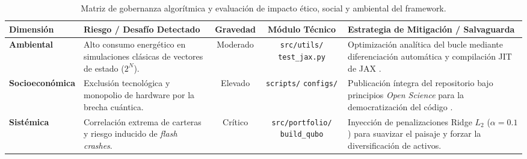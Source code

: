 \begin{table}[htbp]
    \centering
    \caption{Matriz de gobernanza algorítmica y evaluación de impacto ético, social y ambiental del framework.}
    \label{tab:evaluacion_impacto_etica}
    \begin{tabular}{lp{4.2cm}ccp{4.2cm}}
        \toprule
        \textbf{Dimensión} & \textbf{Riesgo / Desafío Detectado} & \textbf{Gravedad} & \textbf{Módulo Técnico} & \textbf{Estrategia de Mitigación / Salvaguarda} \\
        \midrule
        \textbf{Ambiental} & Alto consumo energético en simulaciones clásicas de vectores de estado ($2^N$). & Moderado & \texttt{src/utils/} \texttt{test\_jax.py} & Optimización analítica del bucle mediante diferenciación automática y compilación JIT de JAX \cite{GreenQuantum2023}. \\
        \addlinespace
        \textbf{Socioeconómica} & Exclusión tecnológica y monopolio de hardware por la brecha cuántica. & Elevado & \texttt{scripts/} \texttt{configs/} & Publicación íntegra del repositorio bajo principios \textit{Open Science} para la democratización del código \cite{NisqSociety2022}. \\
        \addlinespace
        \textbf{Sistémica} & Correlación extrema de carteras y riesgo inducido de \textit{flash crashes}. & Crítico & \texttt{src/portfolio/} \texttt{build\_qubo} & Inyección de penalizaciones Ridge $L_2$ ($\alpha=0.1$) para suavizar el paisaje y forzar la diversificación de activos. \\
        \bottomrule
    \end{tabular}
\end{table}